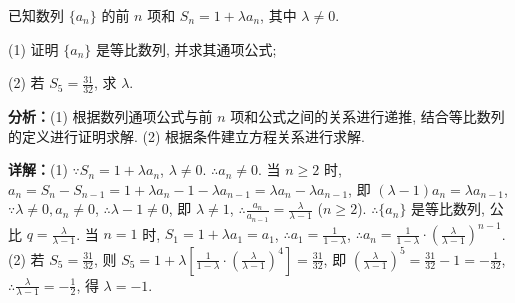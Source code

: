 \begin{question}[points=12]
已知数列 $\{a_n\}$ 的前 $n$ 项和 $S_n=1+\lambda a_n$, 其中 $\lambda\ne 0$.

(1) 证明 $\{a_n\}$ 是等比数列, 并求其通项公式;

(2) 若 $S_5=\frac{31}{32}$, 求 $\lambda$.
\begin{solution}

\textbf{分析：}(1) 根据数列通项公式与前 $n$ 项和公式之间的关系进行递推, 结合等比数列的定义进行证明求解. (2) 根据条件建立方程关系进行求解.

\textbf{详解：}(1) $\because S_n=1+\lambda a_n$, $\lambda\ne0$. $\therefore a_n\ne0$. 当 $n\ge2$ 时, $a_n=S_n-S_{n-1}=1+\lambda a_n-1-\lambda a_{n-1}=\lambda a_n-\lambda a_{n-1}$, 即 $(\lambda-1)a_n=\lambda a_{n-1}$, $\because\lambda\ne0,a_n\ne0$, $\therefore\lambda-1\ne0$, 即 $\lambda\ne1$, $\therefore\frac{a_n}{a_{n-1}}=\frac{\lambda}{\lambda-1}$ ($n\ge2$). $\therefore\{a_n\}$ 是等比数列, 公比 $q=\frac{\lambda}{\lambda-1}$. 当 $n=1$ 时, $S_1=1+\lambda a_1=a_1$, $\therefore a_1=\frac{1}{1-\lambda}$, $\therefore a_n=\frac{1}{1-\lambda}\cdot(\frac{\lambda}{\lambda-1})^{n-1}$.
(2) 若 $S_5=\frac{31}{32}$, 则 $S_5=1+\lambda[\frac{1}{1-\lambda}\cdot(\frac{\lambda}{\lambda-1})^4]=\frac{31}{32}$, 即 $(\frac{\lambda}{\lambda-1})^5=\frac{31}{32}-1=-\frac{1}{32}$, $\therefore\frac{\lambda}{\lambda-1}=-\frac{1}{2}$, 得 $\lambda=-1$.
\end{solution}
\end{question}

